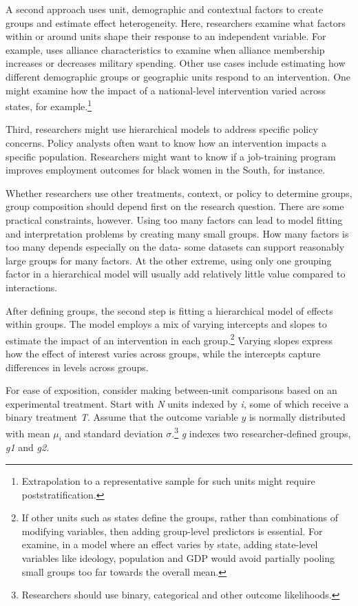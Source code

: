 \documentclass[12pt]{article}
\begin{document}
A second approach uses unit, demographic and contextual factors to create groups and estimate  effect heterogeneity. 
Here, researchers examine what factors within or around units shape their response to an independent variable.
For example, \citet{Alley2021isq} uses alliance characteristics to examine when alliance membership increases or decreases military spending.
Other use cases include estimating how different demographic groups or geographic units respond to an intervention.
One might examine how the impact of a national-level intervention varied across states, for example.\footnote{Extrapolation to a representative sample for such units might require poststratification.}


Third, researchers might use hierarchical models to address specific policy concerns.
Policy analysts often want to know how an intervention impacts a specific population. 
Researchers might want to know if a job-training program improves employment outcomes for black women in the South, for instance.  


Whether researchers use other treatments, context, or policy to determine groups, group composition should depend first on the research question.
There are some practical constraints, however.
Using too many factors can lead to model fitting and interpretation problems by creating many small groups.
How many factors is too many depends especially on the data- some datasets can support reasonably large groups for many factors. 
At the other extreme, using only one grouping factor in a hierarchical model will usually add relatively little value compared to interactions. 


After defining groups, the second step is fitting a hierarchical model of effects within groups.
The model employs a mix of varying intercepts and slopes to estimate the impact of an intervention in each group.\footnote{If other units such as states define the groups, rather than combinations of modifying variables, then adding group-level predictors is essential. For examine, in a model where an effect varies by state, adding state-level variables like ideology, population and GDP would avoid partially pooling small groups too far towards the overall mean.}
Varying slopes express how the effect of interest varies across groups, while the intercepts capture differences in levels across groups. 


For ease of exposition, consider making between-unit comparisons based on an experimental treatment.    
Start with \textit{N} units indexed by \textit{i}, some of which receive a binary treatment \textit{T}.
Assume that the outcome variable ${y}$ is normally distributed with mean $\mu_i$ and standard deviation $\sigma$.\footnote{Researchers should use binary, categorical and other outcome likelihoods.}
\textit{g} indexes two researcher-defined groups, \textit{g1} and \textit{g2}.
\end{document}
